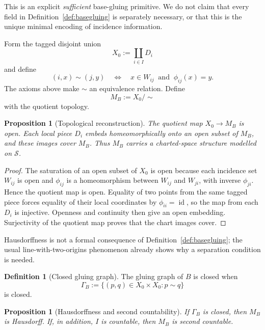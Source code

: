 \documentclass[11pt,a4paper]{article}
\newtheorem{proposition}[theorem]{Proposition}
\theoremstyle{definition}
\newtheorem{definition}[theorem]{Definition}
\theoremstyle{remark}
\newcommand{\Smodel}{\mathcal{S}}
\newcommand{\id}{\operatorname{id}}
\begin{document}
This is an explicit \emph{sufficient} base-gluing primitive.  We do not
claim that every field in Definition~\ref{def:basegluing} is separately necessary,
or that this is the unique minimal encoding of incidence information.

Form the tagged disjoint union
\[
   X_{0}:=\coprod_{i\in I}D_i
\tag{5.3}
\]
and define
\[
   (i,x)\sim(j,y)
   \quad\Longleftrightarrow\quad
   x\in W_{ij}\ \text{ and }\ \phi_{ij}(x)=y.
\tag{5.4}
\]
The axioms above make \(\sim\) an equivalence relation.  Define
\[
   M_B:=X_{0}/\!\sim
\tag{5.5}
\]
with the quotient topology.

\begin{proposition}[Topological reconstruction]
\label{prop:top-reconstruct}
The quotient map \(X_{0}\to M_B\) is open.  Each local piece \(D_i\)
embeds homeomorphically onto an open subset of \(M_B\), and these images
cover \(M_B\).  Thus \(M_B\) carries a charted-space structure modelled on
\(\Smodel\).
\end{proposition}

\begin{proof}
The saturation of an open subset of \(X_{0}\) is open because each
incidence set \(W_{ij}\) is open and \(\phi_{ij}\) is a homeomorphism
between \(W_{ij}\) and \(W_{ji}\), with inverse \(\phi_{ji}\).  Hence the
quotient map is open.  Equality of two points from the same tagged piece
forces equality of their local coordinates by \(\phi_{ii}=\id\), so the
map from each \(D_i\) is injective.  Openness and continuity then give an
open embedding.  Surjectivity of the quotient map proves that the chart
images cover.
\end{proof}

Hausdorffness is not a formal consequence of Definition~\ref{def:basegluing}; the
usual line-with-two-origins phenomenon already shows why a separation
condition is needed.

\begin{definition}[Closed gluing graph]
\label{def:closedgraph}
The gluing graph of \(B\) is closed when
\[
   \Gamma_B
   :=
   \{(p,q)\in X_0\times X_0:p\sim q\}
\tag{5.6}
\]
is closed.
\end{definition}

\begin{proposition}[Hausdorffness and second countability]
\label{prop:haus-second}
If \(\Gamma_B\) is closed, then \(M_B\) is Hausdorff.  If, in addition,
\(I\) is countable, then \(M_B\) is second countable.
\end{proposition}
\end{document}
